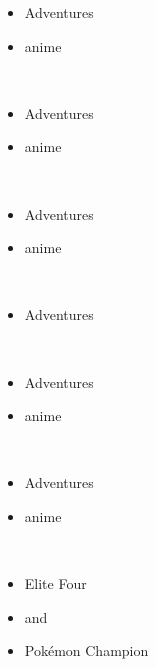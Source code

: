 \documentclass[a4paper,12pt]{article}
\begin{document}
\begin{itemize}
\item Adventures
\item anime
\end{itemize}\\ \par \vspace{0.5cm}

\begin{itemize}
\item Adventures
\item anime
\end{itemize}\\ \par \vspace{0.5cm}

\begin{itemize}
\item Adventures
\item anime
\end{itemize}\\ \par \vspace{0.5cm}

\begin{itemize}
\item Adventures
\end{itemize}\\ \par \vspace{0.5cm}

\begin{itemize}
\item Adventures
\item anime
\end{itemize}\\ \par \vspace{0.5cm}

\begin{itemize}
\item Adventures
\item anime
\end{itemize}\\ \par \vspace{0.5cm}

\begin{itemize}
\item Elite Four
\item and
\item Pokémon Champion
\end{itemize}\\ \par \vspace{0.5cm}
\end{document}
